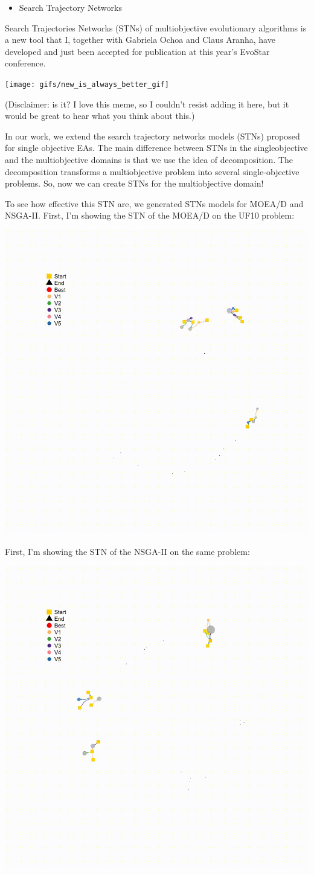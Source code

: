 \documentclass[
]{article}
\providecommand{\tightlist}{%
  \setlength{\itemsep}{0pt}\setlength{\parskip}{0pt}}
\begin{document}
\begin{itemize}
\tightlist
\item
  Search Trajectory Networks
\end{itemize}

Search Trajectories Networks (STNs) of multiobjective evolutionary
algorithms is a new tool that I, together with Gabriela Ochoa and Claus
Aranha, have developed and just been accepted for publication at this
year's EvoStar conference.

\begin{center}\texttt{[image: gifs/new\_is\_always\_better\_gif]} \end{center}

(Disclaimer: is it? I love this meme, so I couldn't resist adding it
here, but it would be great to hear what you think about this.)

In our work, we extend the search trajectory networks models (STNs)
proposed for single objective EAs. The main difference between STNs in
the singleobjective and the multiobjective domains is that we use the
idea of decomposition. The decomposition transforms a multiobjective
problem into several single-objective problems. So, now we can create
STNs for the multiobjective domain!

To see how effective this STN are, we generated STNs models for MOEA/D
and NSGA-II. First, I'm showing the STN of the MOEA/D on the UF10
problem:

\begin{center}\includegraphics[width=0.5\linewidth]{gifs/moead_uf10} \end{center}

First, I'm showing the STN of the NSGA-II on the same problem:

\begin{center}\includegraphics[width=0.5\linewidth]{gifs/nsga2_uf10} \end{center}
\end{document}
